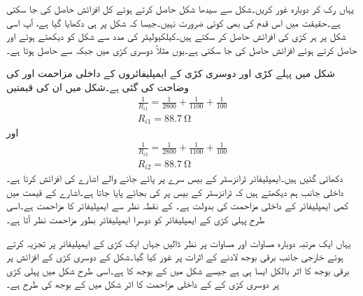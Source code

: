 یہاں رک کر دوبارہ غور کریں۔شکل  سے  سیدھا شکل  حاصل کرتے ہوئے کل افزائش حاصل کی جا سکتی ہے۔حقیقت میں اس قدم کی بھی کوئی ضرورت نہیں۔جیسا کہ شکل  پر ہی دکھایا گیا ہے، آپ اسی شکل پر ہر کڑی کی افزائش  حاصل کر سکتے ہیں۔کیلکیولیٹر کی مدد سے شکل کو دیکھتے ہوئے  اور  حاصل کرتے ہوئے افزائش حاصل کی جا سکتی ہے۔یوں مثلاً دوسری کڑی میں  جبکہ  سے  حاصل ہوتا ہے۔

شکل  میں پہلے کڑی اور دوسری کڑی کے ایمپلیفائروں کے داخلی مزاحمت  اور  کی وضاحت کی گئی ہے۔شکل  میں ان کی قیمتیں
\begin{align*}
\frac{1}{R_{i1}}=\frac{1}{2800}+\frac{1}{1100}+\frac{1}{100}\\
R_{i1}=\SI{88.7}{\ohm}
\end{align*}
اور 
\begin{align*}
\frac{1}{R_{i2}}=\frac{1}{2800}+\frac{1}{1100}+\frac{1}{100}\\
R_{i2}=\SI{88.7}{\ohm}
\end{align*}
دکھائی گئیں ہیں۔ایمپلیفائر ٹرانزسٹر کے بیس سرے پر پائے جانے والے اشارے کی افزائش کرتا ہے۔داخلی جانب ہم دیکھتے ہیں کہ ٹرانزسٹر کے بیس پر  کی بجائے  پایا جاتا ہے۔اشارے کے قیمت میں کمی ایمپلیفائر کے داخلی مزاحمت  کی بدولت ہے۔ کے نقطہ نظر سے ایمپلیفائر  کا مزاحمت ہے۔اسی طرح پہلی کڑی کے ایمپلیفائر کو دوسرا ایمپلیفائر بطور مزاحمت  نظر آتا ہے۔

یہاں ایک مرتبہ دوبارہ مساوات  اور مساوات  پر نظر ڈالیں جہاں ایک کڑی کے ایمپلیفائر پر تجزیہ کرتے ہوئے خارجی جانب برقی بوجھ لادنے کے اثرات پر غور کیا گیا۔شکل  کے دوسری کڑی کے افزائش پر  برقی بوجھ کا اثر بالکل ایسا ہی ہے جیسے شکل  میں  کے بوجھ کا ہے۔اسی طرح شکل  میں پہلی کڑی پر دوسری کڑی کے   کے داخلی مزاحمت کا اثر شکل  میں  کے بوجھ کی طرح ہے۔  

